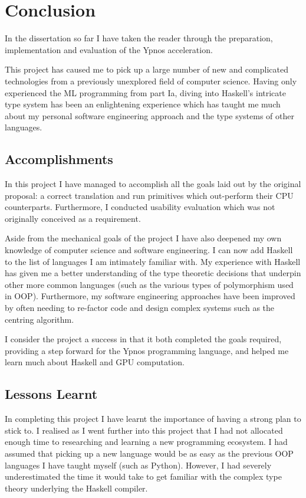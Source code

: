 \documentclass[12pt,a4paper,twoside]{scrbook}
\begin{document}
\chapter{Conclusion}

In the dissertation so far I have taken the reader through the preparation,
implementation and evaluation of the Ypnos acceleration.

This project has caused me to pick up a large number of new and complicated
technologies from a previously unexplored field of computer science. Having only
experienced the ML programming from part Ia, diving into Haskell's intricate
type system has been an enlightening experience which has taught me much about
my personal software engineering approach and the type systems of other
languages.

\section{Accomplishments}

In this project I have managed to accomplish all the goals laid out by the
original proposal: a correct translation and run primitives which out-perform
their CPU counterparts. Furthermore, I conducted usability evaluation which was
not originally conceived as a requirement.

Aside from the mechanical goals of the project I have also deepened my own
knowledge of computer science and software engineering. I can now add Haskell to
the list of languages I am intimately familiar with. My experience with Haskell
has given me a better understanding of the type theoretic decisions that
underpin other more common languages (such as the various types of polymorphism
used in OOP). Furthermore, my software engineering approaches have been improved
by often needing to re-factor code and design complex systems such as the
centring algorithm.

I consider the project a success in that it both completed the goals required,
providing a step forward for the Ypnos programming language, and helped me learn
much about Haskell and GPU computation.

\section{Lessons Learnt}

In completing this project I have learnt the importance of having a strong plan
to stick to. I realised as I went further into this project that I had not
allocated enough time to researching and learning a new programming ecosystem. I
had assumed that picking up a new language would be as easy as the previous OOP
languages I have taught myself (such as Python). However, I had severely
underestimated the time it would take to get familiar with the complex type
theory underlying the Haskell compiler.
\end{document}
